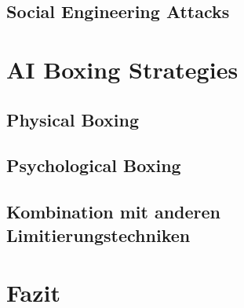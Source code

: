     \subsection{Social Engineering Attacks}
\section{AI Boxing Strategies}
    \subsection{Physical Boxing}
    \subsection{Psychological Boxing}
    \subsection{Kombination mit anderen Limitierungstechniken}
\section{Fazit}

\newpage



\listoffigures


